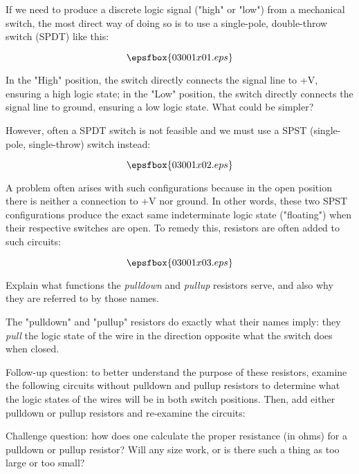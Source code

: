

If we need to produce a discrete logic signal ("high" or "low") from a mechanical switch, the most direct way of doing so is to use a single-pole, double-throw switch (SPDT) like this:

$$\epsfbox{03001x01.eps}$$

In the "High" position, the switch directly connects the signal line to +V, ensuring a high logic state; in the "Low" position, the switch directly connects the signal line to ground, ensuring a low logic state.  What could be simpler?

However, often a SPDT switch is not feasible and we must use a SPST (single-pole, single-throw) switch instead:

$$\epsfbox{03001x02.eps}$$

A problem often arises with such configurations because in the open position there is neither a connection to +V nor ground.  In other words, these two SPST configurations produce the exact same indeterminate logic state ("floating") when their respective switches are open.  To remedy this, resistors are often added to such circuits:

$$\epsfbox{03001x03.eps}$$

Explain what functions the {\it pulldown} and {\it pullup} resistors serve, and also why they are referred to by those names.







The "pulldown" and "pullup" resistors do exactly what their names imply: they {\it pull} the logic state of the wire in the direction opposite what the switch does when closed.

\vskip 10pt

Follow-up question: to better understand the purpose of these resistors, examine the following circuits without pulldown and pullup resistors to determine what the logic states of the wires will be in both switch positions.  Then, add either pulldown or pullup resistors and re-examine the circuits:

\vskip 10pt

Challenge question: how does one calculate the proper resistance (in ohms) for a pulldown or pullup resistor?  Will any size work, or is there such a thing as too large or too small?

